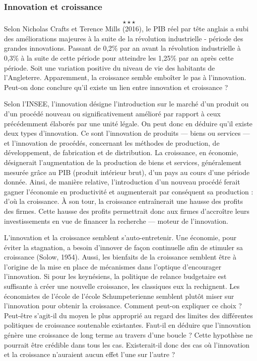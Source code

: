\newpage \begin{center}
	\subsubsection*{Innovation et croissance}
\end{center}
$$\star \star \star$$
\indent Selon Nicholas Crafts et Terence Mills (2016), le PIB réel par tête anglais a subi des améliorations majeures à la suite de la révolution industrielle - période des grandes innovations. Passant de 0,2\% par an avant la révolution industrielle à 0,3\% à la suite de cette période pour atteindre les 1,25\% par an après cette période. Soit une variation positive du niveau de vie des habitants de l'Angleterre. Apparemment, la croissance semble emboîter le pas à l'innovation. Peut-on donc conclure qu'il existe un lien entre innovation et croissance ?

Selon l'INSEE, l’innovation désigne l’introduction sur le marché d'un produit ou d'un procédé nouveau ou significativement amélioré par rapport à ceux précédemment élaborés par une unité légale. On peut donc en déduire qu'il existe deux types d'innovation. Ce sont l'innovation de produits — biens ou services — et l'innovation de procédés, concernant les méthodes de production, de développement, de fabrication et de distribution. La croissance, en économie, désignerait l'augmentation de la production de biens et services, généralement mesurée grâce au PIB (produit intérieur brut), d'un pays au cours d'une période donnée. Ainsi, de manière relative, l'introduction d'un nouveau procédé ferait gagner l'économie en productivité et augmenterait par conséquent sa production : d'où la croissance. À son tour, la croissance entraînerait une hausse des profits des firmes. Cette hausse des profits permettrait donc aux firmes d'accroître leurs investissements en vue de financer la recherche — moteur de l'innovation. 

L'innovation et la croissance semblent s'auto-entretenir. Une économie, pour éviter la stagnation, a besoin d'innover de façon continuelle afin de stimuler sa croissance (Solow, 1954). Aussi, les bienfaits de la croissance semblent être à l'origine de la mise en place de mécanismes dans l'optique d'encourager l'innovation. Si pour les keynésiens, la politique de relance budgetaire est suffisante à créer une nouvelle croissance, les classiques eux la rechignent. Les économistes de l'école de l'école Schumpeterienne semblent plutôt miser sur l'innovation pour obtenir la croissance. Comment peut-on expliquer ce choix ? Peut-être s'agit-il du moyen le plus approprié au regard des limites des différentes politiques de croissance soutenable existantes. Faut-il en déduire que l'innovation génère une croissance de long terme au travers d'une boucle ? Cette hypothèse ne pourrait être crédible dans tous les cas. Existerait-il donc des cas où l'innovation et la croissance n'auraient aucun effet l'une sur l'autre ?

